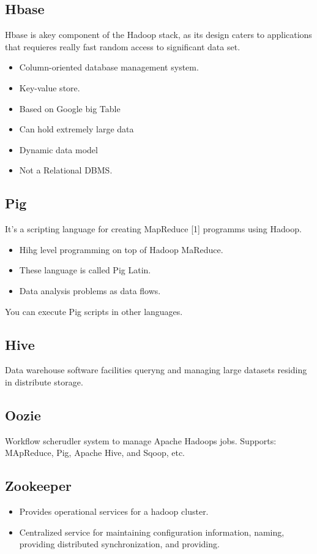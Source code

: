 \documentclass{article}
\begin{document}
\subsection{Hbase}
Hbase is akey component of the Hadoop stack, as its design caters to applications that requieres really fast random access to significant data set.
\begin{itemize}
\item Column-oriented database management system. 
\item Key-value store. 
\item Based on Google big Table
\item Can hold extremely large data
\item Dynamic data model
\item Not a Relational DBMS.
\end{itemize}
\subsection{Pig}
It's a scripting language for creating MapReduce [1] programms using Hadoop. 
\begin{itemize}
\item Hihg level programming on top of Hadoop MaReduce. 
\item These language is called Pig Latin.
\item Data analysis problems as data flows. 
\end{itemize}
You can execute Pig scripts in other languages. 
\subsection{Hive}
Data warehouse software facilities queryng and managing large datasets residing in distribute storage. 
\subsection{Oozie}
Workflow scherudler system to manage Apache Hadoops jobs. Supports: MApReduce, Pig, Apache Hive, and Sqoop, etc. 
\subsection{Zookeeper}
\begin{itemize}
\item Provides operational services for a hadoop cluster. 
\item Centralized service for maintaining configuration information, naming, providing distributed synchronization, and providing. 
\end{itemize}
\end{document}
